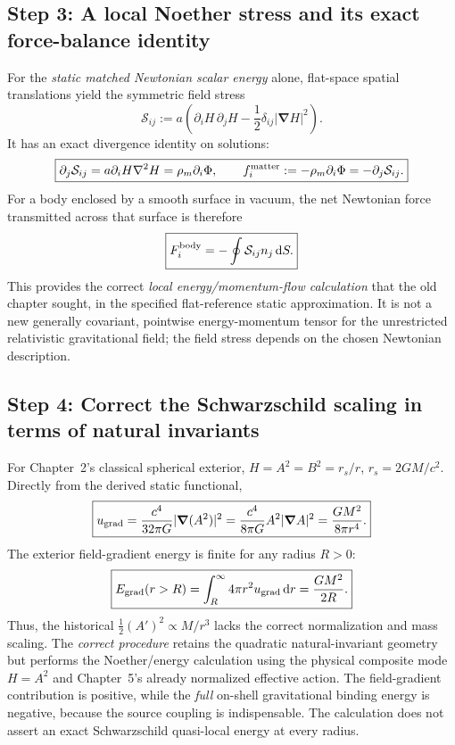 \documentclass[11pt,a4paper]{article}
\theoremstyle{definition}\newtheorem{definition}[theorem]{Definition}
\theoremstyle{remark}\newtheorem{remark}[theorem]{Remark}
\newcommand{\dd}{\mathrm d}
\begin{document}
\subsection{Step 3: A local Noether stress and its exact force-balance identity}
\label{sec:v13-stress}
For the \emph{static matched Newtonian scalar energy} alone, flat-space
spatial translations yield the symmetric field stress
\begin{equation}\label{eq:v13-stress}
\boxed{\mathcal S_{ij}:=a\left(\partial_iH\,\partial_jH
-\frac12\delta_{ij}|\bm\nabla H|^2\right).}
\end{equation}
It has an exact divergence identity on solutions:
\begin{equation}\label{eq:v13-force}
\boxed{\partial_j\mathcal S_{ij}
=a\partial_iH\nabla^2H
=\rho_m\partial_i\Phi,
\qquad f_i^{\rm matter}:=-\rho_m\partial_i\Phi
=-\partial_j\mathcal S_{ij}.}
\end{equation}
For a body enclosed by a smooth surface in vacuum, the net Newtonian
force transmitted across that surface is therefore
\begin{equation}\label{eq:v13-surface}
\boxed{F_i^{\rm body}=-\oint\mathcal S_{ij}n_j\,\dd S.}
\end{equation}
This provides the correct \emph{local energy/momentum-flow calculation}
that the old chapter sought, in the specified flat-reference static
approximation.  It is not a new generally covariant, pointwise
energy-momentum tensor for the unrestricted relativistic gravitational
field; the field stress depends on the chosen Newtonian description.

\subsection{Step 4: Correct the Schwarzschild scaling in terms of natural invariants}
\label{sec:v13-schwarzschild}
For Chapter~2's classical spherical exterior, $H=A^2=B^2=r_s/r$,
$r_s=2GM/c^2$.  Directly from the derived static functional,
\begin{equation}\label{eq:v13-uA}
\boxed{u_{\rm grad}
=\frac{c^4}{32\pi G}|\bm\nabla(A^2)|^2
=\frac{c^4}{8\pi G}A^2|\bm\nabla A|^2
=\frac{GM^2}{8\pi r^4}.}
\end{equation}
The exterior field-gradient energy is finite for any radius $R>0$:
\begin{equation}\label{eq:v13-Eext}
\boxed{E_{\rm grad}(r>R)=\int_R^\infty4\pi r^2u_{\rm grad}\,\dd r
=\frac{GM^2}{2R}.}
\end{equation}
Thus, the historical $\tfrac12(A')^2\propto M/r^3$ lacks the
correct normalization and mass scaling.  The \emph{correct procedure}
retains the quadratic natural-invariant geometry but performs the
Noether/energy calculation using the physical composite mode
$H=A^2$ and Chapter~5's already normalized effective action.
The field-gradient contribution is positive, while the \emph{full}
on-shell gravitational binding energy is negative, because the
source coupling is indispensable.  The calculation does not assert
an exact Schwarzschild quasi-local energy at every radius.
\end{document}
